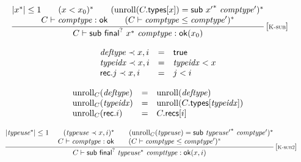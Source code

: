 \vspace{1ex}

$$
\begin{array}{@{}c@{}}\displaystyle
\frac{
\begin{array}{@{}c@{}}
{|{x^\ast}|} \leq 1
 \qquad
(x < x_0)^\ast
 \qquad
({\mathrm{unroll}}(C{.}\mathsf{types}{}[x]) = \mathsf{sub}~{{x'}^\ast}~{\mathit{comptype}'})^\ast
 \\
C \vdash {\mathit{comptype}} : \mathsf{ok}
 \qquad
(C \vdash {\mathit{comptype}} \leq {\mathit{comptype}'})^\ast
\end{array}
}{
C \vdash \mathsf{sub}~{\mathsf{final}^?}~{x^\ast}~{\mathit{comptype}} : {\mathsf{ok}}{(x_0)}
} \, {[\textsc{\scriptsize K{-}sub}]}
\qquad
\end{array}
$$

$$
\begin{array}[t]{@{}lcl@{}l@{}}
{\mathit{deftype}} \prec x, i & = & \mathsf{true} \\
{\mathit{typeidx}} \prec x, i & = & {\mathit{typeidx}} < x \\
\mathsf{rec} {.} j \prec x, i & = & j < i \\
\end{array}
$$

$$
\begin{array}[t]{@{}lcl@{}l@{}}
{{\mathrm{unroll}}}_{C}({\mathit{deftype}}) & = & {\mathrm{unroll}}({\mathit{deftype}}) \\
{{\mathrm{unroll}}}_{C}({\mathit{typeidx}}) & = & {\mathrm{unroll}}(C{.}\mathsf{types}{}[{\mathit{typeidx}}]) \\
{{\mathrm{unroll}}}_{C}(\mathsf{rec} {.} i) & = & C{.}\mathsf{recs}{}[i] \\
\end{array}
$$

$$
\begin{array}{@{}c@{}}\displaystyle
\frac{
\begin{array}{@{}c@{}}
{|{{\mathit{typeuse}}^\ast}|} \leq 1
 \qquad
({\mathit{typeuse}} \prec x, i)^\ast
 \qquad
({{\mathrm{unroll}}}_{C}({\mathit{typeuse}}) = \mathsf{sub}~{{\mathit{typeuse}'}^\ast}~{\mathit{comptype}'})^\ast
 \\
C \vdash {\mathit{comptype}} : \mathsf{ok}
 \qquad
(C \vdash {\mathit{comptype}} \leq {\mathit{comptype}'})^\ast
\end{array}
}{
C \vdash \mathsf{sub}~{\mathsf{final}^?}~{{\mathit{typeuse}}^\ast}~{\mathit{compttype}} : {\mathsf{ok}}{(x, i)}
} \, {[\textsc{\scriptsize K{-}sub2}]}
\qquad
\end{array}
$$

